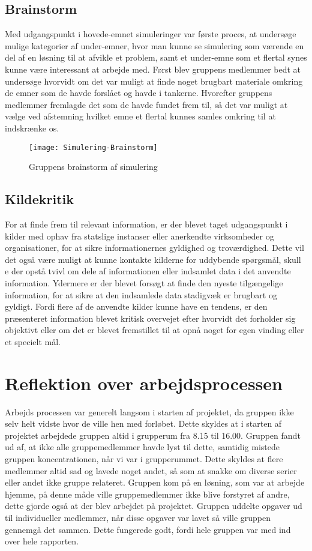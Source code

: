 \subsection{Brainstorm}
Med udgangspunkt i hovede-emnet simuleringer var første proces, at undersøge mulige kategorier af under-emner, hvor man kunne se simulering som værende en del af en løsning til at afvikle et problem, samt et under-emne som et flertal synes kunne være interessant at arbejde med. Først blev gruppens medlemmer bedt at undersøge hvorvidt om det var muligt at finde noget brugbart materiale omkring de emner som de havde forslået og havde i tankerne. Hvorefter gruppens medlemmer fremlagde det som de havde fundet frem til, så det var muligt at vælge ved afstemning hvilket emne et flertal kunnes samles omkring til at indskrænke os. 

\begin{figure}[h]
\texttt{[image: Simulering-Brainstorm]}
\centering
\caption{Gruppens brainstorm af simulering}\label{Simulering_Brainstorm}
\end{figure}

\subsection{Kildekritik}
For at finde frem til relevant information, er der blevet taget udgangspunkt i kilder med ophav fra statslige instanser eller anerkendte virksomheder og organisationer, for at sikre informationernes gyldighed og troværdighed. Dette vil det også være muligt at kunne kontakte kilderne for uddybende spørgsmål, skull
e der opstå tvivl om dele af informationen eller indsamlet data i det anvendte information. Ydermere er der blevet forsøgt at finde den nyeste tilgængelige information, for at sikre at den indsamlede data stadigvæk er brugbart og gyldigt. Fordi flere af de anvendte kilder kunne have en tendens, er den præsenteret information blevet kritisk overvejet efter hvorvidt det forholder sig objektivt eller om det er blevet fremstillet til at opnå noget for egen vinding eller et specielt mål.

\section{Reflektion over arbejdsprocessen}\label{Reflektion-over-arbejdsprocessen}
Arbejds processen var generelt langsom i starten af projektet, da gruppen ikke selv helt vidste hvor de ville hen med forløbet. Dette skyldes at i starten af projektet arbejdede gruppen altid i grupperum fra 8.15 til 16.00. Gruppen fandt ud af, at ikke alle gruppemedlemmer havde lyst til dette, samtidig mistede gruppen koncentrationen, når vi var i grupperummet. Dette skyldes at flere medlemmer altid sad og lavede noget andet, så som at snakke om diverse serier eller andet ikke gruppe relateret. Gruppen kom på en løsning, som var at arbejde hjemme, på denne måde ville gruppemedlemmer ikke blive forstyret af andre, dette gjorde også at der blev arbejdet på projektet. Gruppen uddelte opgaver ud til individueller medlemmer, når disse opgaver var lavet så ville gruppen gennemgå det sammen. Dette fungerede godt, fordi hele gruppen var med ind over hele rapporten. 

